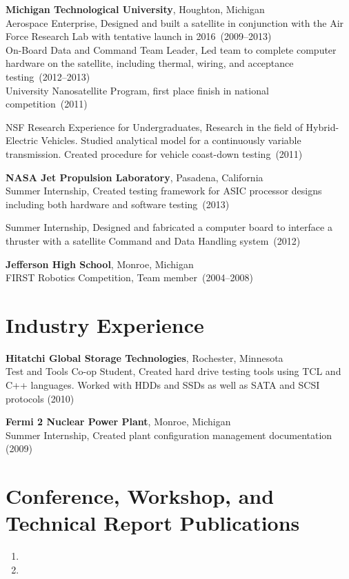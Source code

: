 \documentclass{article}
\begin{document}
{\bf Michigan Technological University}, Houghton, Michigan \\
Aerospace Enterprise, Designed and built a satellite in conjunction with the
Air Force Research Lab with tentative launch in 2016~(2009--2013) \\
On-Board Data and Command Team Leader, Led team to complete computer hardware
on the satellite, including thermal, wiring, and acceptance testing~(2012--2013) \\
University Nanosatellite Program, first place finish in national competition~(2011)

NSF Research Experience for Undergraduates, Research in the field of
Hybrid-Electric Vehicles. Studied analytical model for a continuously variable
transmission. Created procedure for vehicle coast-down testing~(2011)


{\bf NASA Jet Propulsion Laboratory}, Pasadena, California \\
Summer Internship, Created testing framework for ASIC processor designs
including both hardware and software testing~(2013)

Summer Internship, Designed and fabricated a computer board to interface a
thruster with a satellite Command and Data Handling system~(2012)

{\bf Jefferson High School}, Monroe, Michigan \\
FIRST Robotics Competition, Team member~(2004--2008)


\section*{Industry Experience}
\vspace{-6pt}

{\bf Hitatchi Global Storage Technologies}, Rochester, Minnesota \\
Test and Tools Co-op Student, Created hard drive testing tools using TCL and
C++ languages. Worked with HDDs and SSDs as well as SATA and SCSI protocols (2010)

{\bf Fermi 2 Nuclear Power Plant}, Monroe, Michigan \\
Summer Internship, Created plant configuration management documentation (2009)


\section*{Conference, Workshop, and Technical Report Publications}
\begin{enumerate}
  \item {}
  \item {}
\end{enumerate}
\end{document}
